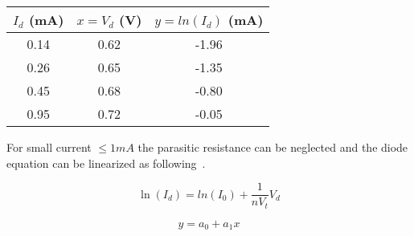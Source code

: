\documentclass[letterpaper,12pt]{article}
\begin{document}
\noindent%
\begin{minipage}{\linewidth}%
\label{visina8}%
\end{minipage}

\begin{center}
\label{tbl:bins} %
\begin{tabular}{|ccc|} 
\hline
\multicolumn{1}{|c}{$I_d$ (mA)} & \multicolumn{1}{|c|}{$x = V_d$ (V)}& \multicolumn{1}{c|}{$y = ln(I_d)$ (mA)}  \\
\hline
0.14 &   0.62  & -1.96\\
0.26 &   0.65 & -1.35\\
0.45 &   0.68 & -0.80\\
0.95 &   0.72 & -0.05\\
\hline
\end{tabular}
\end{center}
For small current $\leq1mA$ the parasitic resistance can be neglected and the diode equation can be linearized as following~\cite{sup}.


\begin{equation}
\ln(I_d) = ln(I_0) + \frac{1}{nV_t}V_d 
\end{equation}

\begin{equation}
    y = a_0 +a_1x
\end{equation}
\end{document}
